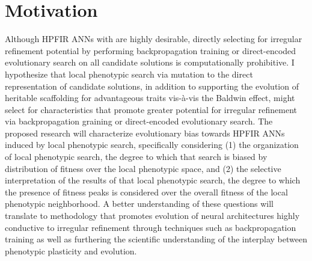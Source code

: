 \section{Motivation}

Although HPFIR ANNs with are highly desirable, directly selecting for irregular refinement potential by performing backpropagation training or direct-encoded evolutionary search on all candidate solutions is computationally prohibitive.
I hypothesize that local phenotypic search via mutation to the direct representation of candidate solutions, in addition to supporting the evolution of heritable scaffolding for advantageous traits vis-\`{a}-vis the Baldwin effect, might select for characteristics that promote greater potential for irregular refinement via backpropagation graining or direct-encoded evolutionary search.
The proposed research will characterize evolutionary bias towards HPFIR ANNs induced by local phenotypic search, specifically considering (1) the organization of local phenotypic search, the degree to which that search is biased by distribution of fitness over the local phenotypic space, and (2) the selective interpretation of the results of that local phenotypic search, the degree to which the presence of fitness peaks is considered over the overall fitness of the local phenotypic neighborhood.
A better understanding of these questions will translate to methodology that promotes evolution of neural architectures highly conductive to irregular refinement through techniques such as backpropagation training as well as furthering the scientific understanding of the interplay between phenotypic plasticity and evolution.
